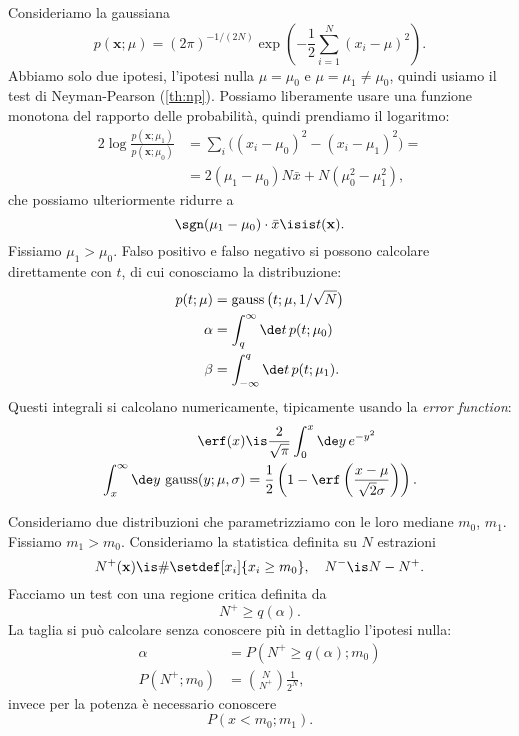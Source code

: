 \begin{solution*}
	Consideriamo la gaussiana
	\begin{equation*}
		p(\mathbf x;\mu)
		= (2\pi)^{-1/(2N)}
		\exp \left( -\frac12 \sum_{i=1}^N (x_i-\mu)^2 \right).
	\end{equation*}
	Abbiamo solo due ipotesi,
	l'ipotesi nulla $\mu=\mu_0$ e $\mu=\mu_1\neq\mu_0$,
	quindi usiamo il test di Neyman-Pearson (\autoref{th:np}).
	Possiamo liberamente usare una funzione monotona del rapporto delle probabilità,
	quindi prendiamo il logaritmo:
	\begin{align*}
		2\log \frac {p(\mathbf x;\mu_1)} {p(\mathbf x;\mu_0)}
		&= \sum_i \big((x_i-\mu_0)^2 - (x_i-\mu_1)^2\big) = \\
		&= 2(\mu_1-\mu_0)N\bar x + N(\mu_0^2-\mu_1^2),
	\end{align*}
	che possiamo ulteriormente ridurre a
	\begin{equation*}
		\sgn(\mu_1-\mu_0)\cdot \bar x
		\isis t(\mathbf x).
	\end{equation*}
	Fissiamo $\mu_1 > \mu_0$.
	Falso positivo e falso negativo si possono calcolare direttamente con $t$,
	di cui conosciamo la distribuzione:
	\begin{align*}
		p(t;\mu)
		&= \operatorname{gauss}\big(t;\mu,1/\sqrt N\big) \\
		\alpha
		&= \int_q^\infty \de t\, p(t;\mu_0) \\
		\beta
		&= \int_{-\infty}^q \de t\, p(t;\mu_1).
	\end{align*}
	Questi integrali si calcolano numericamente,
	tipicamente usando la \emph{error function}:
	\begin{align*}
		\erf(x)
		&\is \frac2{\sqrt\pi} \int_0^x \de y\,e^{-y^2} \\
		\int_x^\infty \de y\, \operatorname{gauss}(y;\mu,\sigma)
		&= \frac12 \left( 1 - \erf\left(\frac{x-\mu}{\sqrt2\sigma}\right) \right).
	\end{align*}
\end{solution*}

\begin{example}
	Consideriamo due distribuzioni che parametrizziamo con le loro mediane $m_0$, $m_1$.
	Fissiamo $m_1>m_0$.
	Consideriamo la statistica definita su $N$ estrazioni
	\begin{equation*}
		N^+(\mathbf x)
		\is \#\setdef[x_i]{x_i\ge m_0},
		\quad N^- \is N - N^+.
	\end{equation*}
	Facciamo un test con una regione critica definita da
	\begin{equation*}
		N^+ \ge q(\alpha).
	\end{equation*}
	La taglia si può calcolare senza conoscere più in dettaglio l'ipotesi nulla:
	\begin{align*}
		\alpha
		&= P(N^+\ge q(\alpha);m_0) \\
		P(N^+;m_0)
		&= \binom N{N^+} \frac1{2^N},
	\end{align*}
	invece per la potenza è necessario conoscere
	\begin{equation*}
		P(x<m_0;m_1).
	\end{equation*}
\end{example}

